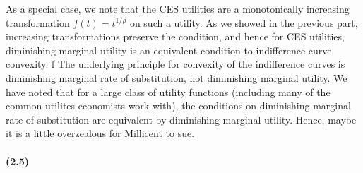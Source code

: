 \documentclass[10pt,letter]{article}
\begin{document}
As a special case, we note that the CES utilities are a monotonically increasing transformation $f(t) = t^{1/\rho}$ on such a utility. As we showed in the previous part, increasing transformations preserve the condition, and hence for CES utilities, diminishing marginal utility is an equivalent condition to indifference curve convexity.
f
The underlying principle for convexity of the indifference curves is diminishing marginal rate of substitution, not diminishing marginal utility. We have noted that for a large class of utility functions (including many of the common utilites economists work with), the conditions on diminishing marginal rate of substitution are equivalent by diminishing marginal utility. Hence, maybe it is a little overzealous for Millicent to sue.
\paragraph{(2.5)}
\end{document}
